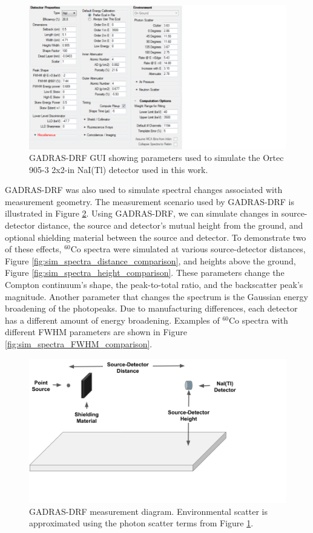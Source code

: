 \begin{figure}[H]
	\centering
	\includegraphics[trim=0 0 390 0,clip,width=0.7\linewidth]{images/gadras_parameters}
	\caption{GADRAS-DRF GUI showing parameters used to simulate the Ortec 905-3 2x2-in NaI(Tl) detector used in this work.}
	\label{fig:gadras_parameters}
\end{figure}


GADRAS-DRF was also used to simulate spectral changes associated with measurement geometry. The measurement scenario used by GADRAS-DRF is illustrated in Figure \ref{fig:gadras_measurement_setup}. Using GADRAS-DRF, we can simulate changes in source-detector distance, the source and detector's mutual height from the ground, and optional shielding material between the source and detector. To demonstrate two of these effects, $^{60}$Co spectra were simulated at various source-detector distances, Figure \ref{fig:sim_spectra_distance_comparison}, and heights above the ground, Figure \ref{fig:sim_spectra_height_comparison}. These parameters change the Compton continuum's shape, the peak-to-total ratio, and the backscatter peak's magnitude. Another parameter that changes the spectrum is the Gaussian energy broadening of the photopeaks. Due to manufacturing differences, each detector has a different amount of energy broadening. Examples of $^{60}$Co spectra with different FWHM parameters are shown in Figure \ref{fig:sim_spectra_FWHM_comparison}.


\begin{figure}[H]
	\centering
	\includegraphics[trim=0 0 180 0,clip,width=0.9\linewidth]{images/gadras_measurement_setup}
	\caption{GADRAS-DRF measurement diagram. Environmental scatter is approximated using the photon scatter terms from Figure \ref{fig:gadras_parameters}.}
	\label{fig:gadras_measurement_setup}
\end{figure}



